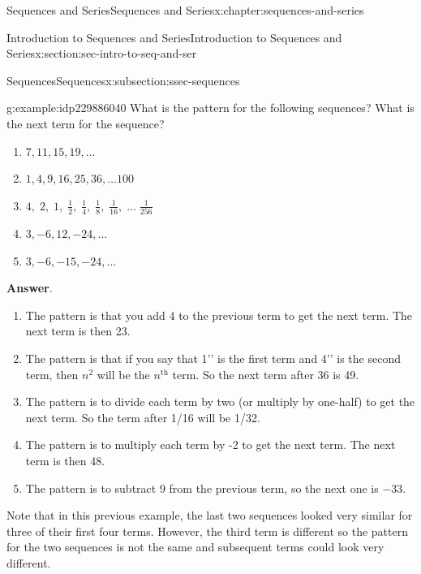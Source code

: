 \documentclass[twoside,10pt,]{book}
\newcommand{\blocktitlefont}{\relax}
\numberwithin{equation}{section}
\newcommand{\nth}{{n^{\text{th}}}}
\begin{document}
\begin{chapterptx}{Sequences and Series}{}{Sequences and Series}{}{}{x:chapter:sequences-and-series}
\begin{sectionptx}{Introduction to Sequences and Series}{}{Introduction to Sequences and Series}{}{}{x:section:sec-intro-to-seq-and-ser}
\begin{subsectionptx}{Sequences}{}{Sequences}{}{}{x:subsection:ssec-sequences}
\begin{example}{}{g:example:idp229886040}
What is the pattern for the following sequences?  What is the next term for the sequence? %
\begin{enumerate}[label=(\alph*)]
\item{}\(\displaystyle 7,11,15,19,\ldots \)%
\item{}\(\displaystyle 1, 4, 9, 16, 25, 36, \ldots 100 \)%
\item{}\(\displaystyle 4,\;2,\;1,\;\frac{1}{2},\;\frac{1}{4},\;\frac{1}{8},\;\frac{1}{{16}},\;...\;\frac{1}{{256}} \)%
\item{}\(\displaystyle 3, -6, 12, -24, \ldots \)%
\item{}\(\displaystyle 3, -6, -15, -24, \ldots \)%
\end{enumerate}
\par\smallskip%
\noindent\textbf{\blocktitlefont Answer}.\label{g:answer:idp229885016}{}\hypertarget{g:answer:idp229885016}{}\quad{}%
\begin{enumerate}[label=(\alph*)]
\item{}The pattern is that you add 4 to the previous term to get the next term.  The next term is then 23.%
\item{}The pattern is that if you say that \textasciigrave{}\textasciigrave{}1'{}'{} is the first term and \textasciigrave{}\textasciigrave{}4'{}'{} is the second term, then \(n^2\) will be the \(\nth{}\) term.  So the next term after 36 is 49.%
\item{}The pattern is to divide each term by two (or multiply by one-half) to get the next term.  So the term after \textdollar{}1\slash{}16\textdollar{} will be \textdollar{}1\slash{}32\textdollar{}.%
\item{}The pattern is to multiply each term by \textdollar{}-2\textdollar{} to get the next term.  The next term is then 48.%
\item{}The pattern is to subtract 9 from the previous term, so the next one is \(-33\).%
\end{enumerate}
\end{example}
%
\par
Note that in this previous example, the last two sequences looked very similar for three of their first four terms.  However, the third term is different so the pattern for the two sequences is not the same and subsequent terms could look very different.%
\end{subsectionptx}
%
%
\typeout{************************************************}
\typeout{************************************************}

\end{sectionptx}
\end{chapterptx}
\end{document}
